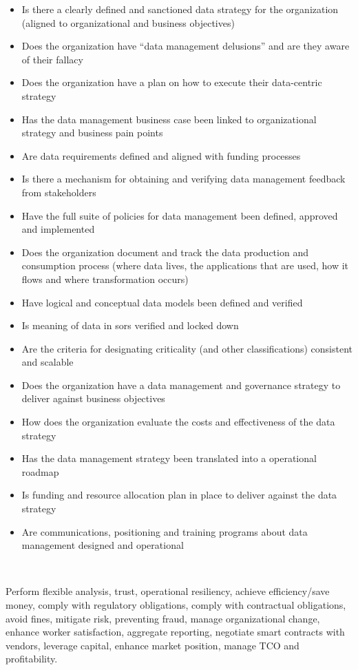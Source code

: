 \begin{description}[nosep,font=\bfseries]
  \begin{itemize}
    \item Is there a clearly defined and sanctioned data strategy for the organization (aligned to organizational and business objectives)
    \item Does the organization have “data management delusions” and are they aware of their fallacy
    \item Does the organization have a plan on how to execute their data-centric strategy
    \item Has the data management business case been linked to organizational strategy and business pain points
    \item Are data requirements defined and aligned with funding processes
    \item Is there a mechanism for obtaining and verifying data management feedback from stakeholders
    \item Have the full suite of policies for data management been defined, approved and implemented
    \item Does the organization document and track the data production and consumption process
          (where data lives, the applications that are used, how it flows and where transformation occurs)
    \item Have logical and conceptual data models been defined and verified
    \item Is meaning of data in \glspl{sor} verified and locked down
    \item Are the criteria for designating criticality (and other classifications) consistent and scalable
    \item Does the organization have a data management and governance strategy to deliver against business objectives
    \item How does the organization evaluate the costs and effectiveness of the data strategy
    \item Has the data management strategy been translated into a operational roadmap
    \item Is funding and resource allocation plan in place to deliver against the data strategy
    \item Are communications, positioning and training programs about data management designed and operational
  \end{itemize}

  ~\\

  \item [High-level Organizational Goals]
  Perform flexible analysis, trust, operational resiliency, achieve efficiency/\-save money,
  comply with regulatory obligations, comply with contractual obligations, avoid fines,
  mitigate risk, preventing fraud, manage organizational change, enhance worker satisfaction,
  aggregate reporting, negotiate smart contracts with vendors, leverage capital,
  enhance market position, manage TCO and profitability. \\


\end{description}
